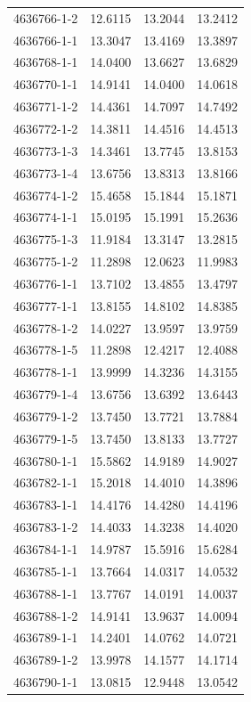 \begin{longtable}{lrrr}
4636766-1-2 & 12.6115 & 13.2044 & 13.2412 \\
4636766-1-1 & 13.3047 & 13.4169 & 13.3897 \\
4636768-1-1 & 14.0400 & 13.6627 & 13.6829 \\
4636770-1-1 & 14.9141 & 14.0400 & 14.0618 \\
4636771-1-2 & 14.4361 & 14.7097 & 14.7492 \\
4636772-1-2 & 14.3811 & 14.4516 & 14.4513 \\
4636773-1-3 & 14.3461 & 13.7745 & 13.8153 \\
4636773-1-4 & 13.6756 & 13.8313 & 13.8166 \\
4636774-1-2 & 15.4658 & 15.1844 & 15.1871 \\
4636774-1-1 & 15.0195 & 15.1991 & 15.2636 \\
4636775-1-3 & 11.9184 & 13.3147 & 13.2815 \\
4636775-1-2 & 11.2898 & 12.0623 & 11.9983 \\
4636776-1-1 & 13.7102 & 13.4855 & 13.4797 \\
4636777-1-1 & 13.8155 & 14.8102 & 14.8385 \\
4636778-1-2 & 14.0227 & 13.9597 & 13.9759 \\
4636778-1-5 & 11.2898 & 12.4217 & 12.4088 \\
4636778-1-1 & 13.9999 & 14.3236 & 14.3155 \\
4636779-1-4 & 13.6756 & 13.6392 & 13.6443 \\
4636779-1-2 & 13.7450 & 13.7721 & 13.7884 \\
4636779-1-5 & 13.7450 & 13.8133 & 13.7727 \\
4636780-1-1 & 15.5862 & 14.9189 & 14.9027 \\
4636782-1-1 & 15.2018 & 14.4010 & 14.3896 \\
4636783-1-1 & 14.4176 & 14.4280 & 14.4196 \\
4636783-1-2 & 14.4033 & 14.3238 & 14.4020 \\
4636784-1-1 & 14.9787 & 15.5916 & 15.6284 \\
4636785-1-1 & 13.7664 & 14.0317 & 14.0532 \\
4636788-1-1 & 13.7767 & 14.0191 & 14.0037 \\
4636788-1-2 & 14.9141 & 13.9637 & 14.0094 \\
4636789-1-1 & 14.2401 & 14.0762 & 14.0721 \\
4636789-1-2 & 13.9978 & 14.1577 & 14.1714 \\
4636790-1-1 & 13.0815 & 12.9448 & 13.0542 \\

\end{longtable}
